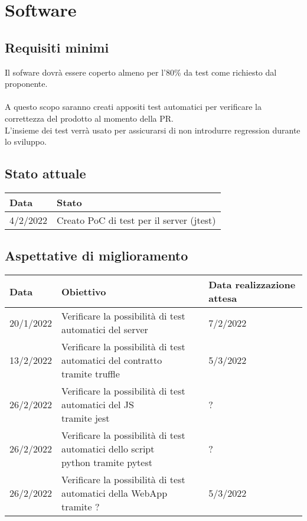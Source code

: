 \documentclass[a4paper, 12pt]{article}
\begin{document}
\section{Software}
\subsection{Requisiti minimi}
Il sofware dovrà essere coperto almeno per l'80\% da test come richiesto dal proponente.\\\\
A questo scopo saranno creati appositi test automatici per verificare la correttezza del prodotto al momento della PR.\\
L'insieme dei test verrà usato per assicurarsi di non introdurre regression durante lo sviluppo.

\subsection{Stato attuale}
\begin{tabular}{|l|l|}\hline
	Data & Stato \\\hline
	4/2/2022 & Creato PoC di test per il server (jtest)\\\hline
\end{tabular}

\subsection{Aspettative di miglioramento}
\begin{tabular}{|l|l|l|}\hline
	Data & Obiettivo & Data realizzazione attesa \\\hline
	20/1/2022 & Verificare la possibilità di test automatici del server & 7/2/2022\\\hline
	13/2/2022 & \pbox{20cm}{Verificare la possibilità di test automatici del contratto\\ tramite truffle} & 5/3/2022\\\hline
	26/2/2022 & \pbox{20cm}{Verificare la possibilità di test automatici del JS \\tramite jest} & ?\\\hline
	26/2/2022 & \pbox{20cm}{Verificare la possibilità di test automatici dello script \\python tramite pytest} & ?\\\hline
	26/2/2022 & \pbox{20cm}{Verificare la possibilità di test automatici della WebApp \\tramite ?} & 5/3/2022\\\hline
\end{tabular}
\end{document}
